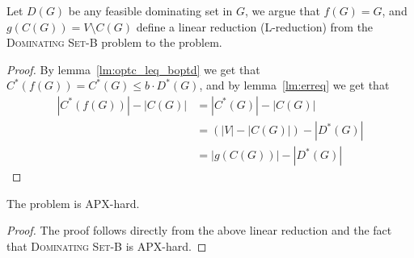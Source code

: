Let $D(G)$ be any feasible dominating set in $G$, 
we argue that $f(G) = G$, and $g(C(G)) = V \setminus C(G)$ 
define a linear reduction (L-reduction) from the \textsc{Dominating Set-B} problem to the 
\textsc{\CARPOOL{}} problem.
\begin{proof}
By lemma~\ref{lm:optc_leq_boptd} we get that $C^*(f(G)) = C^*(G) \leq b \cdot D^*(G)$,
and by lemma~\ref{lm:erreq} we get that 
\begin{equation}
\begin{split}
|C^*(f(G))| - |C(G)|		& = |C^*(G)| - |C(G)| 			\\
							& = (|V| - |C(G)|) - |D^*(G)|	\\
							& = |g(C(G))| - |D^*(G)|
\end{split}
\end{equation}
\end{proof}

\begin{theorem}
The \textsc{\CARPOOL{}} problem is APX-hard.
\end{theorem}

\begin{proof}
The proof follows directly from the above linear reduction and the fact that 
\textsc{Dominating Set-B} is APX-hard. 
\end{proof}